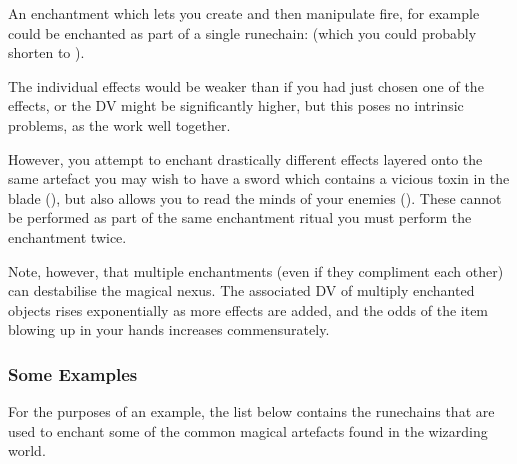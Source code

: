 An enchantment which lets you create and then manipulate fire, for example could be enchanted as part of a single runechain: \rune{\lentus\genero\ignis\lentus\imperum\ignis} (which you could probably shorten to \rune{\lentus\genero\imperum\ignis}). 

The individual effects would be weaker than if you had just chosen one of the effects, or the DV might be significantly higher, but this poses no intrinsic problems, as the  work well together. 

However, you attempt to enchant drastically different effects layered onto the same artefact \minus{} you may wish to have a sword which contains a vicious toxin in the blade (\rune{\velox\perdero\morbus}), but also allows you to read the minds of your enemies (\rune{\aeternum\discite\sensus}). These cannot be performed as part of the same enchantment ritual \minus{} you must perform the enchantment twice. 

Note, however, that multiple enchantments (even if they compliment each other) can destabilise the magical nexus. The associated DV of multiply enchanted objects rises exponentially as more effects are added, and the odds of the item blowing up in your hands increases commensurately.  

\subsubsection{Some Examples}

For the purposes of an example, the list below contains the runechains that are used to enchant some of the common magical artefacts found in the wizarding world. 


